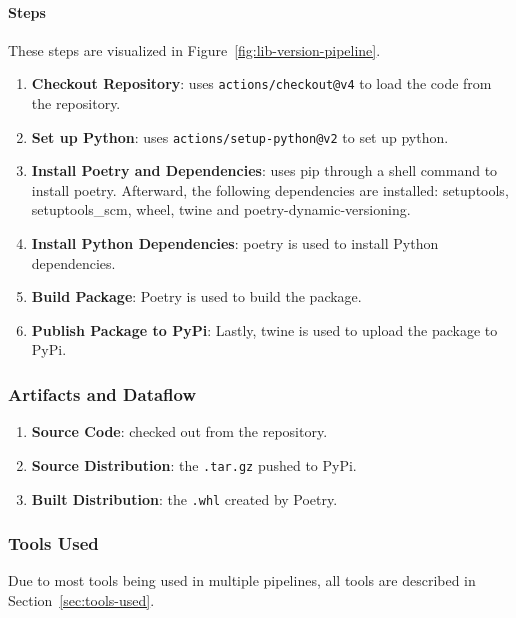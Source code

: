 \paragraph{Steps}
These steps are visualized in Figure~\ref{fig:lib-version-pipeline}.
\begin{enumerate}
    \item \textbf{Checkout Repository}: uses \verb|actions/checkout@v4| to load the code from the repository. 
    \item \textbf{Set up Python}: uses \verb|actions/setup-python@v2| to set up python. 
    \item \textbf{Install Poetry and Dependencies}: uses pip through a shell command to install poetry. Afterward, the following dependencies are installed: setuptools, setuptools\_scm, wheel, twine and poetry-dynamic-versioning.
    \item \textbf{Install Python Dependencies}: poetry is used to install Python dependencies. 
    \item \textbf{Build Package}: Poetry is used to build the package. 
    \item \textbf{Publish Package to PyPi}: Lastly, twine is used to upload the package to PyPi. 
\end{enumerate}
\subsubsection{Artifacts and Dataflow}
\begin{enumerate}
    \item \textbf{Source Code}: checked out from the repository. 
    \item \textbf{Source Distribution}: the \verb|.tar.gz| pushed to PyPi. 
    \item \textbf{Built Distribution}: the \verb|.whl| created by Poetry. 
\end{enumerate}
\subsubsection{Tools Used}
Due to most tools being used in multiple pipelines, all tools are described in Section~\ref{sec:tools-used}.

